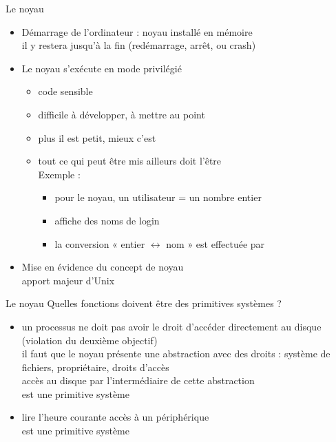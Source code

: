 \begin {frame} {Le noyau}
    \begin {itemize}
	\item Démarrage de l'ordinateur : noyau installé
	    en mémoire \\
	    \implique il y restera jusqu'à la fin (redémarrage,
	    arrêt, ou crash)

	\item Le noyau s'exécute en mode privilégié

	    \begin {itemize}
		\item code sensible
		\item difficile à développer, à mettre au point
		\item plus il est petit, mieux c'est
		\item tout ce qui peut être mis ailleurs doit l'être
		    \\
		    \vspace* {0.8mm}
		    Exemple :
		    \begin {itemize}
			\item pour le noyau, un utilisateur = un nombre
			    entier
			\item {} affiche des noms de login
			\item \implique la conversion
			    « entier $\leftrightarrow$ nom » est
			    effectuée par 

		    \end {itemize}
	    \end {itemize}

	\item Mise en évidence du concept de noyau \\
	    \implique apport majeur d'Unix

    \end {itemize}

\end {frame}

\begin {frame} {Le noyau}
    Quelles fonctions doivent être des primitives systèmes ?

    \begin {itemize}
	\item un processus ne doit pas avoir le droit d'accéder
	    directement au disque (violation du deuxième objectif)
	    \\
	    \implique il faut que le noyau présente une abstraction avec
	    des droits : système de fichiers, propriétaire,
	    droits d'accès \\
	    \implique accès au disque par l'intermédiaire de cette
	    abstraction
	    \\
	    \implique {} est une primitive système

	\item lire l'heure courante \implique accès à un périphérique
	    \\
	    \implique {} est une primitive système

    \end {itemize}
\end {frame}

